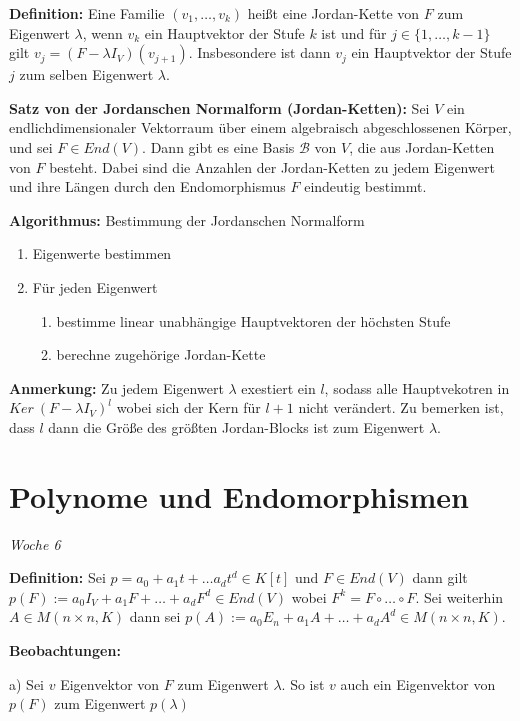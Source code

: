 \documentclass{article}
\begin{document}
\textbf{Definition:} Eine Familie $(v_1,\dots, v_k)$ heißt eine Jordan-Kette
von $F$ zum Eigenwert $\lambda$, wenn $v_k$ ein Hauptvektor der Stufe $k$ ist
und für $j\in\{1,\dots,k-1\}$ gilt $v_j=(F-\lambda I_V)(v_{j+1})$. Insbesondere
ist dann $v_j$ ein Hauptvektor der Stufe $j$ zum selben Eigenwert $\lambda$.

\textbf{Satz von der Jordanschen Normalform (Jordan-Ketten):} Sei $V$ ein
endlichdimensionaler Vektorraum über einem algebraisch abgeschlossenen Körper,
und sei $F\in End(V)$. Dann gibt es eine Basis $\mathcal{B}$ von $V$, die aus
Jordan-Ketten von $F$ besteht. Dabei sind die Anzahlen der Jordan-Ketten zu
jedem Eigenwert und ihre Längen durch den Endomorphismus $F$ eindeutig
bestimmt.

\textbf{Algorithmus:} Bestimmung der Jordanschen Normalform
\begin{enumerate}
	\item Eigenwerte bestimmen
	\item Für jeden Eigenwert
		\begin{enumerate}
			\item bestimme linear unabhängige Hauptvektoren der
				höchsten Stufe
			\item berechne zugehörige Jordan-Kette
		\end{enumerate}
\end{enumerate}

\textbf{Anmerkung:} Zu jedem Eigenwert $\lambda$ exestiert ein $l$, sodass alle
Hauptvekotren in $Ker\ (F-\lambda I_V)^l$ wobei sich der Kern für $l+1$ nicht
verändert. Zu bemerken ist, dass $l$ dann die Größe des größten Jordan-Blocks
ist zum Eigenwert $\lambda$.

\section{Polynome und Endomorphismen}

\textit{\small \hspace{-1.5cm}Woche 6}

\textbf{Definition:} Sei $p=a_0+a_1t+\dots a_dt^d\in K[t]$ und $F\in End(V)$
dann gilt $p(F):=a_0I_V+a_1F+\dots+a_dF^d\in End(V)$ wobei $F^k=F\circ\dots
\circ F$. Sei weiterhin $A\in M(n\times n,K)$ dann sei $p(A):= a_0 E_n
+a_1A+\dots+a_dA^d\in M(n\times n,K)$.

\textbf{Beobachtungen:} 

a) Sei $v$ Eigenvektor von $F$ zum Eigenwert $\lambda$. So
ist $v$ auch ein Eigenvektor von $p(F)$ zum Eigenwert $p(\lambda)$
\end{document}
